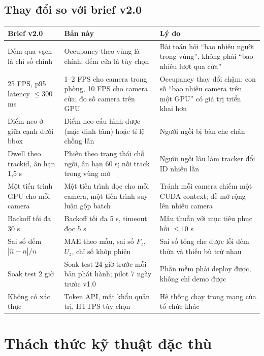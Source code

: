 \documentclass[10pt,a4paper,oneside,openany]{report}
\newcommand{\breakus}{\textunderscore\allowbreak}
\newcommand{\code}[1]{{\ttfamily\let\_\breakus #1}}
\newcommand{\tabhead}[1]{\textsf{\bfseries\color{ink}#1}}
\newenvironment{bang}{\par\small\rowcolors{2}{rowgray}{white}}{\par\vspace{0.3em}}
\begin{document}
\section{Thay đổi so với brief v2.0}
\begin{bang}
\begin{xltabular}{\linewidth}{L{38mm}L{44mm}Y}
\toprule
\tabhead{Brief v2.0} & \tabhead{Bản này} & \tabhead{Lý do} \\
\midrule
\endhead
Đếm qua vạch là chỉ số chính & Occupancy theo vùng là chính; đếm cửa là tùy chọn & Bài toán hỏi \enquote{bao nhiêu người trong vùng}, không phải \enquote{bao nhiêu lượt qua cửa} \\
25 FPS, p95 latency $\le 300$ ms & 1--2 FPS cho camera trong phòng, 10 FPS cho camera cửa; đo số camera trên GPU & Occupancy thay đổi chậm; con số \enquote{bao nhiêu camera trên một GPU} có giá trị triển khai hơn \\
Điểm neo ở giữa cạnh dưới bbox & Điểm neo cấu hình được (mặc định tâm) hoặc tỉ lệ chồng lấn & Người ngồi bị bàn che chân \\
Dwell theo \code{track\_id}, ân hạn 1,5 s & Phiên theo trạng thái chỗ ngồi, ân hạn 60 s; nối track trong vùng mở & Người ngồi lâu làm tracker đổi ID nhiều lần \\
Một tiến trình GPU cho mỗi camera & Một tiến trình đọc cho mỗi camera, một tiến trình suy luận gộp batch & Tránh mỗi camera chiếm một CUDA context; dễ mở rộng lên nhiều camera \\
Backoff tối đa 30 s & Backoff tối đa 5 s, timeout đọc 5 s & Mâu thuẫn với mục tiêu phục hồi $\le 10$ s \\
Sai số đếm $|\hat n-n|/n$ & MAE theo mẫu, sai số $F_z$, $U_z$, chỉ số khớp phiên & Sai số tổng che được lỗi đếm thừa và thiếu bù trừ nhau \\
Soak test 2 giờ & Soak test 24 giờ trước mỗi bản phát hành; pilot 7 ngày trước v1.0 & Phần mềm phải deploy được, không chỉ demo được \\
Không có xác thực & Token API, mật khẩu quản trị, HTTPS tùy chọn & Hệ thống chạy trong mạng của tổ chức khác \\
\bottomrule
\end{xltabular}
\end{bang}
\chapter{Thách thức kỹ thuật đặc thù}\label{ch:thachthuc}
\end{document}
